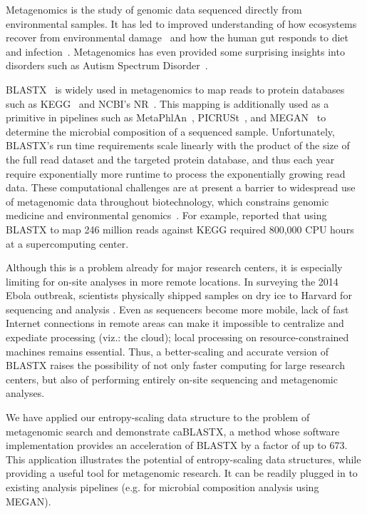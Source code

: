 \documentclass[review,preprint,12pt]{elsarticle}
\renewcommand{\cite}{\citep} %
\theoremstyle{definition}
\theoremstyle{remark}
\numberwithin{equation}{section}
\begin{document}
Metagenomics is the study of genomic data sequenced directly from environmental
samples.
It has led to improved understanding of how ecosystems recover
from environmental damage~\cite{tyson2004community} and how the human gut responds 
to diet
and infection~\cite{david2014host}.
Metagenomics has even provided some surprising insights into disorders 
such as Autism Spectrum Disorder~\cite{macfabe2012short}.

BLASTX~\cite{altschul1990basic} is widely used in metagenomics to map
reads to protein databases such as KEGG~\cite{kanehisa2000kegg} and NCBI's 
NR~\cite{sayers2011database}.
This mapping is additionally used as a primitive in pipelines such as MetaPhlAn~\cite{segata2012metagenomic}, 
PICRUSt~\cite{langille2013predictive}, and MEGAN~\cite{huson2011integrative} to
determine the microbial composition of a sequenced sample.
Unfortunately, BLASTX's run time requirements scale linearly with the product 
of the size of the full read dataset and the targeted protein database, and 
thus each year require exponentially more runtime to process the exponentially 
growing read data. 
These computational challenges are at present a barrier to widespread use of 
metagenomic data throughout biotechnology, which constrains genomic medicine 
and environmental genomics~\cite{frank2008gastrointestinal}.
For example, \citet{mackelprang2011metagenomic} reported that using BLASTX to map 246
million reads against KEGG required 800,000 CPU hours at a supercomputing 
center.

Although this is a problem already for major research centers, it is especially
limiting for on-site analyses in more remote locations.
In surveying the 2014 Ebola outbreak, scientists physically shipped samples on 
dry ice to Harvard for sequencing and analysis \cite{gire2014genomic}.
Even as sequencers become more mobile, lack of fast Internet connections in remote
areas can make it impossible to centralize and expediate processing (viz.: the cloud);
local processing on resource-constrained machines remains essential.
Thus, a better-scaling and accurate version of BLASTX raises the possibility of 
not only faster computing for large research centers, but also of performing
entirely on-site sequencing and metagenomic analyses.

We have applied our entropy-scaling data structure to the problem of 
metagenomic search and demonstrate caBLASTX, a method whose software 
implementation provides an acceleration of BLASTX by a factor of up 
to 673.
This application illustrates the potential of entropy-scaling data structures, while
providing a useful tool for metagenomic research.
It can be readily plugged in to existing analysis pipelines (e.g. for microbial 
composition analysis using MEGAN).
\end{document}
